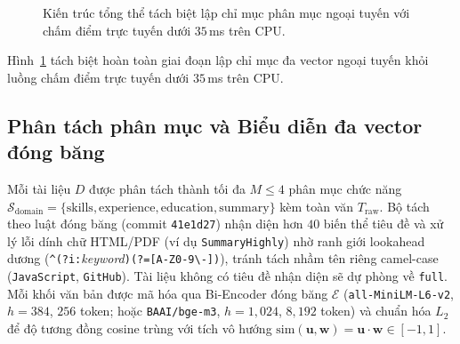 \begin{figure}[tbp]
{%
}
\caption{Kiến trúc tổng thể tách biệt lập chỉ mục phân mục ngoại tuyến với chấm điểm trực tuyến dưới $35$\,ms trên CPU.}
\label{fig:arch}
\end{figure}

Hình~\ref{fig:arch} tách biệt hoàn toàn giai đoạn lập chỉ mục đa vector ngoại tuyến khỏi luồng chấm điểm trực tuyến dưới $35$\,ms trên CPU.

\subsection{Phân tách phân mục và Biểu diễn đa vector đóng băng}
Mỗi tài liệu $D$ được phân tách thành tối đa $M \le 4$ phân mục chức năng $\mathcal{S}_{\text{domain}} = \{\text{skills}, \text{experience}, \text{education}, \text{summary}\}$ kèm toàn văn $T_{\text{raw}}$. Bộ tách theo luật đóng băng (commit \texttt{41e1d27}) nhận diện hơn $40$ biến thể tiêu đề và xử lý lỗi dính chữ HTML/PDF (ví dụ \texttt{SummaryHighly}) nhờ ranh giới lookahead dương (\texttt{\textasciicircum(?i:}\textit{keyword}\texttt{)(?=[A-Z0-9\textbackslash-])}), tránh tách nhầm tên riêng camel-case (\texttt{JavaScript}, \texttt{GitHub}). Tài liệu không có tiêu đề nhận diện sẽ dự phòng về \texttt{full}. Mỗi khối văn bản được mã hóa qua Bi-Encoder đóng băng $\mathcal{E}$ (\texttt{all-MiniLM-L6-v2}, $h=384$, $256$ token; hoặc \texttt{BAAI/bge-m3}, $h=1{,}024$, $8{,}192$ token) và chuẩn hóa $L_2$ để độ tương đồng cosine trùng với tích vô hướng $\text{sim}(\mathbf{u}, \mathbf{w}) = \mathbf{u} \cdot \mathbf{w} \in [-1, 1]$.

